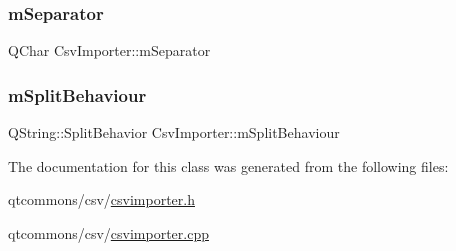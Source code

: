 \subsubsection{\texorpdfstring{mSeparator}{mSeparator}}
{\footnotesize\ttfamily Q\+Char Csv\+Importer\+::m\+Separator\hspace{0.3cm}{\ttfamily [protected]}}

\mbox{\label{class_csv_importer_a9b748dbedd138010aab54cc42892eb65}} 
\subsubsection{\texorpdfstring{mSplitBehaviour}{mSplitBehaviour}}
{\footnotesize\ttfamily Q\+String\+::\+Split\+Behavior Csv\+Importer\+::m\+Split\+Behaviour\hspace{0.3cm}{\ttfamily [protected]}}



The documentation for this class was generated from the following files\+:\begin{DoxyCompactItemize}
\item 
qtcommons/csv/\mbox{\hyperlink{csvimporter_8h}{csvimporter.\+h}}\item 
qtcommons/csv/\mbox{\hyperlink{csvimporter_8cpp}{csvimporter.\+cpp}}\end{DoxyCompactItemize}

